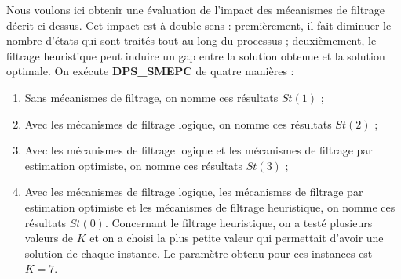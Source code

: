 Nous voulons ici obtenir une évaluation de l'impact des mécanismes de filtrage décrit ci-dessus. Cet impact est à double sens : premièrement, il fait diminuer le nombre d'états qui sont traités tout au long du processus ; deuxièmement, le filtrage heuristique peut induire un gap entre la solution obtenue et la solution optimale.
 On exécute \textbf{DPS\_SMEPC} de quatre manières : 
\begin{enumerate}
	
	\item Sans mécanismes de filtrage, on nomme ces résultats $St(1)$ ;
	\item Avec les mécanismes de filtrage logique, on nomme ces résultats $St(2)$ ;
	\item Avec les mécanismes de filtrage logique et les mécanismes de filtrage par estimation optimiste, on nomme ces résultats $St(3)$ ;
	\item Avec les mécanismes de filtrage logique, les mécanismes de filtrage par estimation optimiste et les mécanismes de filtrage heuristique, on nomme ces résultats $St(0)$. Concernant le filtrage heuristique, on a testé plusieurs valeurs de $K$ et on a choisi la plus petite valeur qui permettait d'avoir une solution de chaque instance. Le paramètre obtenu pour ces instances est $K=7$.
	
\end{enumerate}



